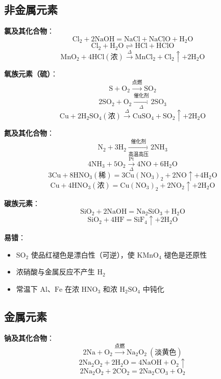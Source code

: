 \subsection{非金属元素}

\textbf{氯及其化合物}：
\[
\text{Cl}_2 + 2\text{NaOH} = \text{NaCl} + \text{NaClO} + \text{H}_2\text{O}
\]
\[
\text{Cl}_2 + \text{H}_2\text{O} \rightleftharpoons \text{HCl} + \text{HClO}
\]
\[
\text{MnO}_2 + 4\text{HCl}(\text{浓}) \xrightarrow{\Delta} \text{MnCl}_2 + \text{Cl}_2\uparrow + 2\text{H}_2\text{O}
\]

\textbf{氧族元素（硫）}：
\[
\text{S} + \text{O}_2 \xrightarrow{\text{点燃}} \text{SO}_2
\]
\[
2\text{SO}_2 + \text{O}_2 \xrightarrow[\Delta]{\text{催化剂}} 2\text{SO}_3
\]
\[
\text{Cu} + 2\text{H}_2\text{SO}_4(\text{浓}) \xrightarrow{\Delta} \text{CuSO}_4 + \text{SO}_2\uparrow + 2\text{H}_2\text{O}
\]

\textbf{氮及其化合物}：
\[
\text{N}_2 + 3\text{H}_2 \xrightarrow[\text{高温高压}]{\text{催化剂}} 2\text{NH}_3
\]
\[
4\text{NH}_3 + 5\text{O}_2 \xrightarrow[\Delta]{\text{Pt}} 4\text{NO} + 6\text{H}_2\text{O}
\]
\[
3\text{Cu} + 8\text{HNO}_3(\text{稀}) = 3\text{Cu}(\text{NO}_3)_2 + 2\text{NO}\uparrow + 4\text{H}_2\text{O}
\]
\[
\text{Cu} + 4\text{HNO}_3(\text{浓}) = \text{Cu}(\text{NO}_3)_2 + 2\text{NO}_2\uparrow + 2\text{H}_2\text{O}
\]

\textbf{碳族元素}：
\[
\text{SiO}_2 + 2\text{NaOH} = \text{Na}_2\text{SiO}_3 + \text{H}_2\text{O}
\]
\[
\text{SiO}_2 + 4\text{HF} = \text{SiF}_4\uparrow + 2\text{H}_2\text{O}
\]

\textbf{易错}：
\begin{itemize}
  \item $\text{SO}_2$ 使品红褪色是漂白性（可逆），使 $\text{KMnO}_4$ 褪色是还原性
  \item 浓硝酸与金属反应不产生 $\text{H}_2$
  \item 常温下 $\text{Al}$、$\text{Fe}$ 在浓 $\text{HNO}_3$ 和浓 $\text{H}_2\text{SO}_4$ 中钝化
\end{itemize}

\subsection{金属元素}

\textbf{钠及其化合物}：
\[
2\text{Na} + \text{O}_2 \xrightarrow{\text{点燃}} \text{Na}_2\text{O}_2\ (\text{淡黄色})
\]
\[
2\text{Na}_2\text{O}_2 + 2\text{H}_2\text{O} = 4\text{NaOH} + \text{O}_2\uparrow
\]
\[
2\text{Na}_2\text{O}_2 + 2\text{CO}_2 = 2\text{Na}_2\text{CO}_3 + \text{O}_2
\]

